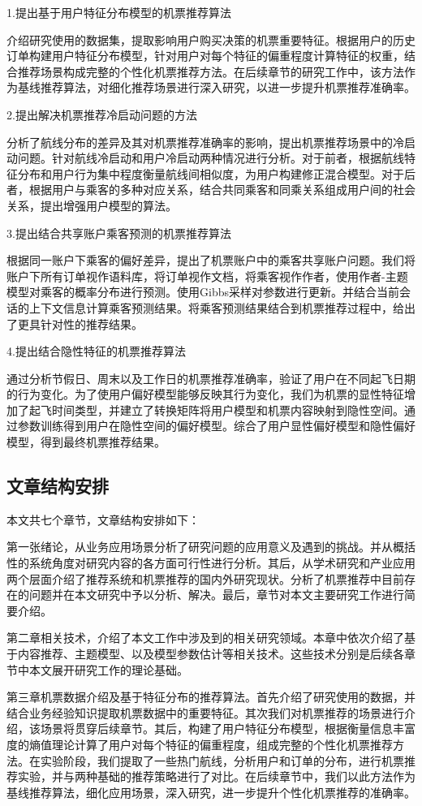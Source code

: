 1.提出基于用户特征分布模型的机票推荐算法

介绍研究使用的数据集，提取影响用户购买决策的机票重要特征。根据用户的历史订单构建用户特征分布模型，针对用户对每个特征的偏重程度计算特征的权重，结合推荐场景构成完整的个性化机票推荐方法。在后续章节的研究工作中，该方法作为基线推荐算法，对细化推荐场景进行深入研究，以进一步提升机票推荐准确率。

2.提出解决机票推荐冷启动问题的方法

分析了航线分布的差异及其对机票推荐准确率的影响，提出机票推荐场景中的冷启动问题。针对航线冷启动和用户冷启动两种情况进行分析。对于前者，根据航线特征分布和用户行为集中程度衡量航线间相似度，为用户构建修正混合模型。对于后者，根据用户与乘客的多种对应关系，结合共同乘客和同乘关系组成用户间的社会关系，提出增强用户模型的算法。


3.提出结合共享账户乘客预测的机票推荐算法

根据同一账户下乘客的偏好差异，提出了机票账户中的乘客共享账户问题。我们将账户下所有订单视作语料库，将订单视作文档，将乘客视作作者，使用作者-主题模型对乘客的概率分布进行预测。使用Gibbs采样对参数进行更新。并结合当前会话的上下文信息计算乘客预测结果。将乘客预测结果结合到机票推荐过程中，给出了更具针对性的推荐结果。

4.提出结合隐性特征的机票推荐算法

通过分析节假日、周末以及工作日的机票推荐准确率，验证了用户在不同起飞日期的行为变化。为了使用户偏好模型能够反映其行为变化，我们为机票的显性特征增加了起飞时间类型，并建立了转换矩阵将用户模型和机票内容映射到隐性空间。通过参数训练得到用户在隐性空间的偏好模型。综合了用户显性偏好模型和隐性偏好模型，得到最终机票推荐结果。


\subsection{文章结构安排}
本文共七个章节，文章结构安排如下：

第一张绪论，从业务应用场景分析了研究问题的应用意义及遇到的挑战。并从概括性的系统角度对研究内容的各方面可行性进行分析。其后，从学术研究和产业应用两个层面介绍了推荐系统和机票推荐的国内外研究现状。分析了机票推荐中目前存在的问题并在本文研究中予以分析、解决。最后，章节对本文主要研究工作进行简要介绍。

第二章相关技术，介绍了本文工作中涉及到的相关研究领域。本章中依次介绍了基于内容推荐、主题模型、以及模型参数估计等相关技术。这些技术分别是后续各章节中本文展开研究工作的理论基础。

第三章机票数据介绍及基于特征分布的推荐算法。首先介绍了研究使用的数据，并结合业务经验知识提取机票数据中的重要特征。其次我们对机票推荐的场景进行介绍，该场景将贯穿后续章节。其后，构建了用户特征分布模型，根据衡量信息丰富度的熵值理论计算了用户对每个特征的偏重程度，组成完整的个性化机票推荐方法。在实验阶段，我们提取了一些热门航线，分析用户和订单的分布，进行机票推荐实验，并与两种基础的推荐策略进行了对比。在后续章节中，我们以此方法作为基线推荐算法，细化应用场景，深入研究，进一步提升个性化机票推荐的准确率。


